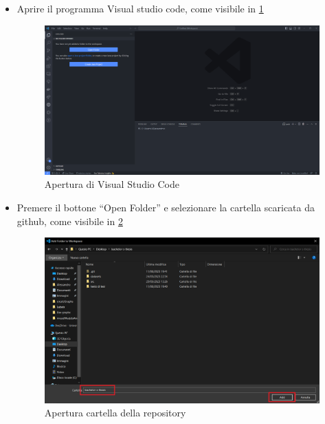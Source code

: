 \begin{itemize}
\item Aprire il programma Visual studio code, come visibile in \ref{img:2}
\begin{figure}
    \begin{center}    
        \includegraphics[width=0.72\linewidth]{images/image2.png}
        \caption{Apertura di Visual Studio Code}
        \label{img:2}
    \end{center}
\end{figure}

\item Premere il bottone “Open Folder” e selezionare la cartella scaricata da github, come visibile in \ref{img:3}

\begin{figure}
    \begin{center}    
        \includegraphics[width=0.72\linewidth]{images/image3.png}
        \caption{Apertura cartella della repository}
        \label{img:3}
    \end{center}
\end{figure}


\end{itemize}
